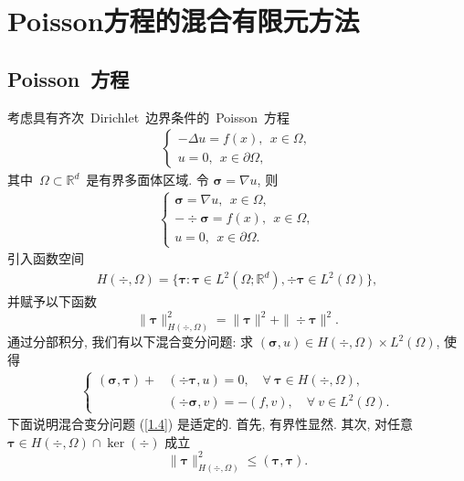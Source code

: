 \chapter{Poisson方程的混合有限元方法}

\section{Poisson~方程}
考虑具有齐次~Dirichlet~边界条件的~Poisson~方程
\begin{align}\label{1.1}
\left\{
\begin{array}{ll}
-\Delta u= f (x), \ \ x\in \Omega, \\
u = 0, \ \ x\in \partial\Omega,
\end{array}
\right.
\end{align}
其中~$\Omega\subset\mathbb{R}^d$~是有界多面体区域. 令 $\boldsymbol\sigma=\nabla u$, 则
\begin{align}\label{1.2}
\left\{
\begin{array}{ll}
\boldsymbol\sigma = \nabla u, \ \ x\in \Omega, \\
-\div\boldsymbol\sigma = f (x), \ \ x\in \Omega, \\
u = 0, \ \ x\in \partial\Omega.
\end{array}
\right.
\end{align}
引入函数空间
\begin{align}\label{1.3}
H(\div,\Omega)=\{\boldsymbol\tau: \boldsymbol\tau\in L^2(\Omega;\mathbb{R}^d), \div\boldsymbol\tau\in L^2(\Omega)\},
\end{align}
并赋予以下函数
$$\|\boldsymbol\tau\|^2_{H(\div, \Omega)}=\|\boldsymbol\tau\|^2+\|\div\boldsymbol\tau\|^2.$$
通过分部积分, 我们有以下混合变分问题: 求 $(\boldsymbol\sigma,u)\in H(\div,\Omega)\times L^2(\Omega)$, 使得
\begin{align}\label{1.4}
\left\{
\begin{array}{ll}
(\boldsymbol\sigma, \boldsymbol\tau)+&(\div\boldsymbol\tau, u) = 0, \quad \forall \ \boldsymbol\tau\in  H(\div,\Omega), \\
&(\div\boldsymbol\sigma, v) = -(f, v), \quad \forall \ v\in L^2(\Omega).
\end{array}
\right.
\end{align}
下面说明混合变分问题 (\ref{1.4}) 是适定的. 首先, 有界性显然. 其次,
对任意 $\boldsymbol\tau\in H(\div,\Omega)\cap\ker(\div)$ 成立
$$\|\boldsymbol\tau\|^2_{H(\div, \Omega)}\leq(\boldsymbol\tau, \boldsymbol\tau).$$ 
